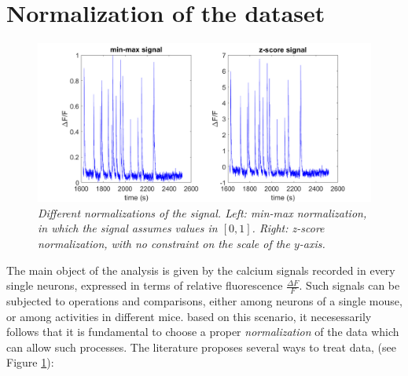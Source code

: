 \documentclass[12pt, a4paper]{report}
\begin{document}
\section{Normalization of the dataset} \label{norm}


\begin{figure}[H]
	
	\begin{center}
		\hspace*{-1cm}
		\includegraphics[scale=.47]{normalizations.png} 
	\end{center} 
	\caption{\textit{Different normalizations of the signal. Left: min-max normalization, in which the signal assumes values in $[0,1]$. Right: z-score normalization, with no constraint on the scale of the $y$-axis. }}
	\label{normalizations}
\end{figure}

The main object of the analysis is given by the calcium signals recorded in every single neurons, expressed in terms of relative fluorescence $\frac{\Delta F}{F}$. Such signals can be subjected to operations and comparisons, either among neurons of a single mouse, or among activities in different mice. based on this scenario, it necesessarily follows that it is fundamental to choose a proper \textit{normalization} of the data which can allow such processes. The literature proposes several ways to treat data, (see Figure \ref{normalizations}):
\end{document}
